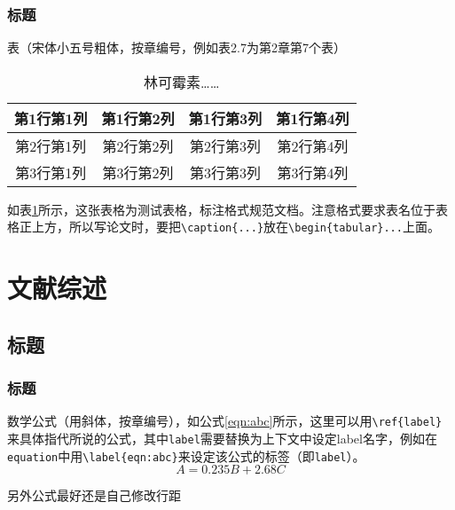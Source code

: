 \documentclass{ecustbachelorthesis}
\begin{document}
\subsection{标题}
\begin{subtext}
表（宋体小五号粗体，按章编号，例如表2.7为第2章第7个表）
\begin{center}
\vspace{-20pt}
\begin{longtable}{cccc}
\caption{林可霉素……}
\label{tab:linc} \\

\endfirsthead

\endhead

\endfoot

\endlastfoot
\hline
    第1行第1列 & 第1行第2列 & 第1行第3列 & 第1行第4列\\ \hline
    第2行第1列 & 第2行第2列 & 第2行第3列 & 第2行第4列\\ 
    第3行第1列 & 第3行第2列 & 第3行第3列 & 第3行第4列\\ \hline 

\end{longtable}
\end{center}
\vspace{-42pt}

如表\ref{tab:linc}所示，这张表格为测试表格，标注格式规范文档。注意格式要求表名位于表格正上方，所以写论文时，要把\verb$\caption{...}$放在\verb$\begin{tabular}...$上面。
\end{subtext}
\chapter{文献综述}
\section{标题}
\subsection{标题}
\begin{subtext}
数学公式（用斜体，按章编号），如公式\ref{eqn:abc}所示，这里可以用\verb$\ref{label}$来具体指代所说的公式，其中\verb$label$需要替换为上下文中设定label名字，例如在\verb$equation$中用\verb$\label{eqn:abc}$来设定该公式的标签（即\verb$label$）。
\setlength{\abovedisplayskip}{0cm}
\setlength{\belowdisplayskip}{0cm}
\begin{equation}
A=0.235B+2.68C \label{eqn:abc}
\end{equation}

另外公式最好还是自己修改行距
\end{subtext}
\end{document}
